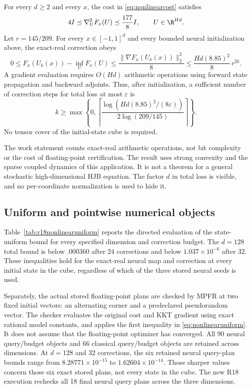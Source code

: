 \begin{theorem}\label{thm:nonlinearcontrol}
For every $d\geq2$ and every $x$, the cost in \eqref{eq:nonlinearcost} satisfies
\begin{equation}
 4I\preceq\nabla_U^2F_x(U)\preceq\frac{177}{8}I,\qquad U\in\R^{Hd}.
 \label{eq:nonlinearhessian}
\end{equation}
Let $r=145/209$. For every $x\in[-1,1]^d$ and every bounded neural initialization above, the exact-real correction obeys
\begin{equation}
 0\leq F_x(U_k(x))-\inf_U F_x(U)
 \leq\frac{\|\nabla F_x(U_k(x))\|_2^2}{8}
 \leq\frac{Hd(8.85)^2}{8}\,r^{2k}.\label{eq:nonlinearuniform}
\end{equation}
A gradient evaluation requires $O(Hd)$ arithmetic operations using forward state propagation and backward adjoints. Thus, after initialization, a sufficient number of correction steps for total loss at most $\varepsilon$ is
\[
 k\geq\max\left\{0,\left\lceil
 \frac{\log(Hd(8.85)^2/(8\varepsilon))}{2\log(209/145)}
 \right\rceil\right\}.
\]
No tensor cover of the initial-state cube is required.
\end{theorem}
The work statement counts exact-real arithmetic operations, not bit complexity or the cost of floating-point certification. The result uses strong convexity and the sparse coupled dynamics of this application. It is not a theorem for a general stochastic high-dimensional HJB equation. The factor $d$ in total loss is visible, and no per-coordinate normalization is used to hide it.

\subsection{Uniform and pointwise numerical objects}
Table~\ref{tab:r18nonlinearuniform} reports the directed evaluation of the state-uniform bound for every specified dimension and correction budget. The $d=128$ total bound is below $.000360$ after 24 corrections and below $1.037\times10^{-6}$ after 32. These inequalities hold for the exact-real neural map and correction at every initial state in the cube, regardless of which of the three stored neural seeds is used.


Separately, the actual stored floating-point plans are checked by MPFR at two fixed initial vectors: an alternating corner and a predeclared pseudorandom vector. The checker evaluates the original cost and KKT gradient using exact rational model constants, and applies the first inequality in \eqref{eq:nonlinearuniform}. It does not assume that the floating-point optimizer has converged. All 90 neural query/budget objects and 66 classical query/budget objects are retained across dimensions. At $d=128$ and 32 corrections, the six retained neural query-plan bounds range from $8.28771\times10^{-15}$ to $1.62604\times10^{-14}$. Those sharper values concern those six exact stored plans, not every state in the cube. The new R18 execution rechecks all 18 final neural query plans across the three dimensions.

